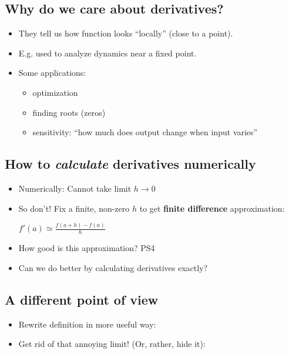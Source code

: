\hypertarget{why-do-we-care-about-derivatives}{%
\subsection{Why do we care about
derivatives?}\label{why-do-we-care-about-derivatives}}

\begin{itemize}
\item
  They tell us how function looks ``locally'' (close to a point).
\item
  E.g. used to analyze dynamics near a fixed point.
\item
  Some applications:

  \begin{itemize}
  \tightlist
  \item
    optimization
  \item
    finding roots (zeros)
  \item
    sensitivity: ``how much does output change when input varies''
  \end{itemize}
\end{itemize}

\hypertarget{how-to-calculate-derivatives-numerically}{%
\subsection{\texorpdfstring{How to \emph{calculate} derivatives
numerically}{How to calculate derivatives numerically}}\label{how-to-calculate-derivatives-numerically}}

\begin{itemize}
\item
  Numerically: Cannot take limit \(h \to 0\)
\item
  So don't! Fix a finite, non-zero \(h\) to get \textbf{finite
  difference} approximation:

  \(f'(a) \simeq \frac{f(a + h) - f(a)}{h}\)
\item
  How good is this approximation? PS4
\item
  Can we do better by calculating derivatives exactly?
\end{itemize}

\hypertarget{a-different-point-of-view}{%
\subsection{A different point of view}\label{a-different-point-of-view}}

\begin{itemize}
\item
  Rewrite definition in more useful way:
\item
  Get rid of that annoying limit! (Or, rather, hide it):
\end{itemize}

